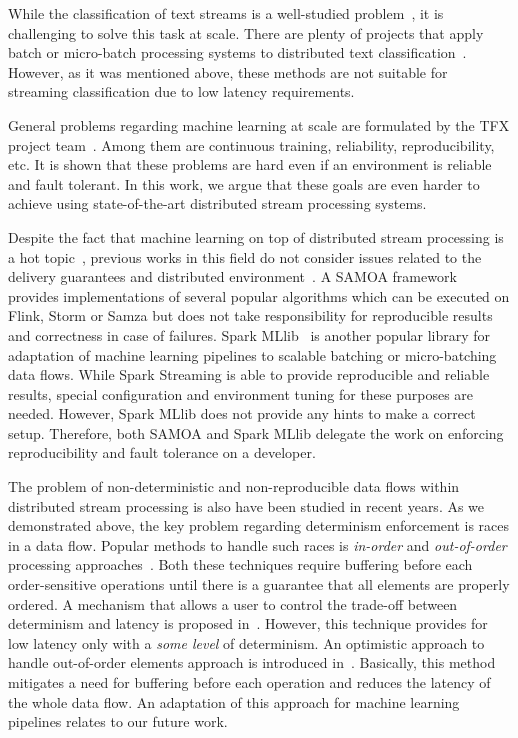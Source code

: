 \label{fs-related}

While the classification of text streams is a well-studied problem~\cite{zhang2008one, tampakas2005}, it is challenging to solve this task at scale. There are plenty of projects that apply batch or micro-batch processing systems to distributed text classification~\cite{semberecki2016distributed, 8029336, baltas2016apache, svyatkovskiy2016large}. However, as it was mentioned above, these methods are not suitable for streaming classification due to low latency requirements. 

General problems regarding machine learning at scale are formulated by the TFX project team~\cite{Baylor:2017:TTP:3097983.3098021}. Among them are continuous training, reliability, reproducibility, etc. It is shown that these problems are hard even if an environment is reliable and fault tolerant. In this work, we argue that these goals are even harder to achieve using state-of-the-art distributed stream processing systems.

Despite the fact that machine learning on top of distributed stream processing is a hot topic~\cite{qiu2016survey}, previous works in this field do not consider issues related to the delivery guarantees and distributed environment~\cite{khumoyun2016real}. A SAMOA framework~\cite{morales2015samoa} provides implementations of several popular algorithms which can be executed on Flink, Storm or Samza but does not take responsibility for reproducible results and correctness in case of failures. Spark MLlib~\cite{meng2016mllib} is another popular library for adaptation of machine learning pipelines to scalable batching or micro-batching data flows. While Spark Streaming is able to provide reproducible and reliable results, special configuration and environment tuning for these purposes are needed. However, Spark MLlib does not provide any hints to make a correct setup. Therefore, both SAMOA and Spark MLlib delegate the work on enforcing reproducibility and fault tolerance on a developer.

The problem of non-deterministic and non-reproducible data flows within distributed stream processing is also have been studied in recent years.  As we demonstrated above, the key problem regarding determinism enforcement is races in a data flow. Popular methods to handle such races is {\em in-order} and {\em out-of-order} processing approaches~\cite{Li:2008:OPN:1453856.1453890}. Both these techniques require buffering before each order-sensitive operations until there is a guarantee that all elements are properly ordered. A mechanism that allows a user to control the trade-off between determinism and latency is proposed in~\cite{Doulkeridis:2014:SLA:2628707.2628782}. However, this technique provides for low latency only with a {\em some level} of determinism. An optimistic approach to handle out-of-order elements approach is introduced in~\cite{we2018seim}. Basically, this method mitigates a need for buffering before each operation and reduces the latency of the whole data flow. An adaptation of this approach for machine learning pipelines relates to our future work.

